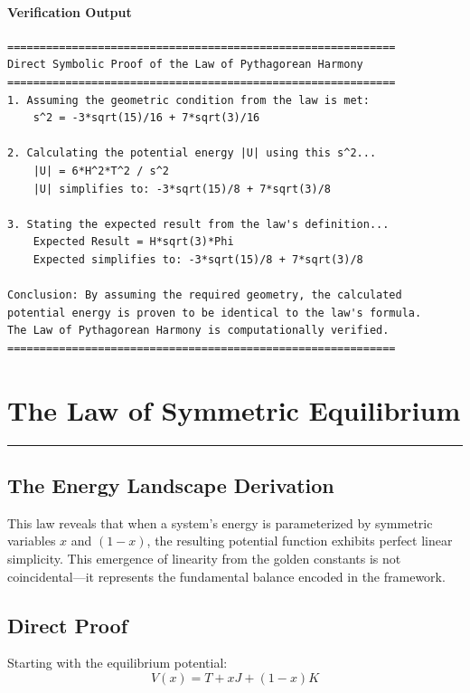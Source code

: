 \paragraph{Verification Output}
\begin{verbatim}
============================================================
Direct Symbolic Proof of the Law of Pythagorean Harmony
============================================================
1. Assuming the geometric condition from the law is met:
    s^2 = -3*sqrt(15)/16 + 7*sqrt(3)/16

2. Calculating the potential energy |U| using this s^2...
    |U| = 6*H^2*T^2 / s^2
    |U| simplifies to: -3*sqrt(15)/8 + 7*sqrt(3)/8

3. Stating the expected result from the law's definition...
    Expected Result = H*sqrt(3)*Phi
    Expected simplifies to: -3*sqrt(15)/8 + 7*sqrt(3)/8

Conclusion: By assuming the required geometry, the calculated
potential energy is proven to be identical to the law's formula.
The Law of Pythagorean Harmony is computationally verified.
============================================================
\end{verbatim}


\section{The Law of Symmetric Equilibrium}
\label{sec:symmetric_equilibrium}
\hrule
\vspace{1em}


\subsection*{The Energy Landscape Derivation}
This law reveals that when a system's energy is parameterized by symmetric variables $x$ and $(1-x)$, the resulting potential function exhibits perfect linear simplicity. This emergence of linearity from the golden constants is not coincidental---it represents the fundamental balance encoded in the framework.

\subsection*{Direct Proof}
Starting with the equilibrium potential:
\[ V(x) = T + xJ + (1-x)K \]

